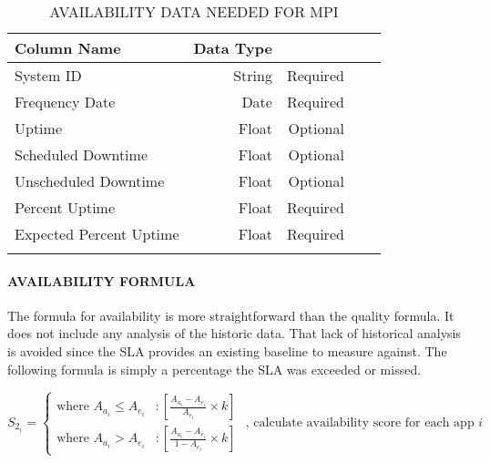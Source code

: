 \documentclass[SDSUThesis.tex]{subfiles}
\begin{document}
            
                \begin{longtable}{@{}l rr rr}
                    \toprule%
                     \centering%
                     {\bfseries Column Name}
                     & {\bfseries Data Type}
                     &  \\
                    
                    \cmidrule[0.4pt](r{0.125em}){1-1}%
                    \cmidrule[0.4pt](lr{0.125em}){2-2}%
                    \cmidrule[0.4pt](l{0.125em}){3-3}%
                    \endhead
                    
                    System ID & String  & Required \\
                    \myrowcolour%
                    Frequency Date & Date & Required \\
                    Uptime & Float & Optional \\
                    \myrowcolour%
                    Scheduled Downtime & Float & Optional \\
                    Unscheduled Downtime & Float  & Optional \\
                    \myrowcolour%
                    Percent Uptime & Float & Required \\
                    Expected Percent Uptime & Float & Required \\
                    
                    \bottomrule
                    
                    \caption{AVAILABILITY DATA NEEDED FOR MPI}
                    \label{tab:availdata}
                \end{longtable}
            
            \paragraph{AVAILABILITY FORMULA}
                The formula for availability is more straightforward than the quality formula.
                It does not include any analysis of the historic data.  That lack of historical
                analysis is avoided since the SLA provides an existing baseline to measure 
                against.  The following formula is simply a percentage the SLA was exceeded
                or missed. 
                
                \begin{displaymath}
                   S_{2_i} = \left\{
                     \begin{array}{lr}
                       \text{where } A_{a_i} \leq A_{e_i} & : \left[ \frac{A_{a_i} - A_{e_i}}{A_{e_i}}\times k \right] \\
                       \text{where } A_{a_i} > A_{e_i}  & : \left[ \frac{A_{a_i} - A_{e_i} }{1-A_{e_i}}\times k \right]
                     \end{array}
                   \right. \text{   , calculate availability score for each app $i$}
                \end{displaymath}
                
\end{document}
